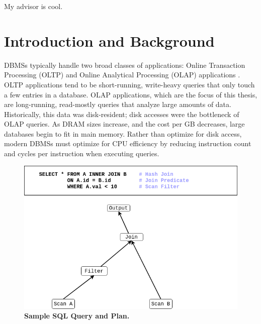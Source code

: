 \documentclass[12pt]{cmuthesis}
\begin{document}
\begin{acknowledgments}
My advisor is cool.
\end{acknowledgments}



\tableofcontents
\listoffigures
\listoftables

\mainmatter


%
%
%
%
%


\chapter{Introduction and Background}
DBMSs typically handle two broad classes of applications: Online Transaction Processing (OLTP) and Online Analytical Processing (OLAP) applications \cite{abadi_phd}. OLTP applications tend to be short-running, write-heavy queries that only touch a few entries in a database. OLAP applications, which are the focus of this thesis, are long-running, read-mostly queries that analyze large amounts of data. Historically, this data was disk-resident; disk accesses were the bottleneck of OLAP queries. As DRAM sizes increase, and the cost per GB decreases, large databases begin to fit in main memory. Rather than optimize for disk access, modern DBMSs must optimize for CPU efficiency by reducing instruction count and cycles per instruction when executing queries.

\begin{figure}[t!]
    \centering
    \includegraphics[scale=0.5]{images/SampleQuery.png}
    \caption{\textbf{Sample SQL Query and Plan.}}
    \label{fig:intro_query}
\end{figure}
\end{document}
